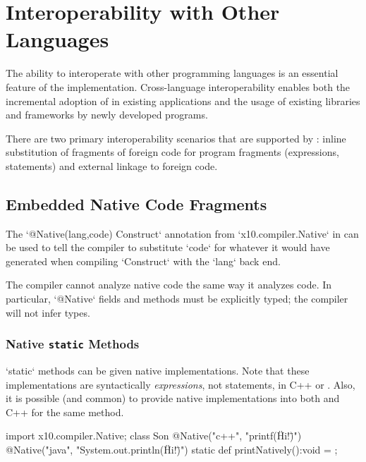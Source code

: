 \chapter{Interoperability with Other Languages}
\label{NativeCode}
\label{Interoperability}

The ability to interoperate with other programming languages is an
essential feature of the \Xten{} implementation.  Cross-language
interoperability enables both the incremental adoption of \Xten{} in
existing applications and the usage of existing libraries and
frameworks by newly developed \Xten{} programs. 

There are two primary interoperability scenarios that are supported by
\XtenCurrVer{}: inline substitution of fragments of foreign code for
\Xten program fragments (expressions, statements) and external linkage
to foreign code.

\section{Embedded Native Code Fragments}

The
\xcd`@Native(lang,code) Construct` annotation from \xcd`x10.compiler.Native` in
\Xten{} can be used to tell the \Xten{} compiler to substitute \xcd`code` for
whatever it would have generated when compiling \xcd`Construct`
with the \xcd`lang` back end.

The compiler cannot analyze native code the same way it analyzes \Xten{} code.  In
particular, \xcd`@Native` fields and methods must be explicitly typed; the
compiler will not infer types.


\subsection{Native {\tt static} Methods}

\xcd`static` methods can be given native implementations.  Note that these
implementations are syntactically {\em expressions}, not statements, in C++ or
\Java{}.   Also, it is possible (and common) to provide native implementations
into both \Java{} and C++ for the same method.
\begin{xten}
import x10.compiler.Native;
class Son {
  @Native("c++", "printf(\"Hi!\")")
  @Native("java", "System.out.println(\"Hi!\")")
  static def printNatively():void = {};
}
\end{xten}
%

